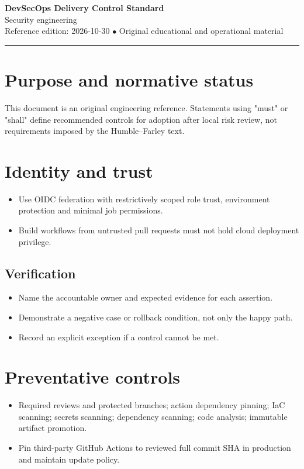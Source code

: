 \documentclass[10pt,letterpaper]{article}
\begin{document}
\begin{center}
{\LARGE\bfseries\color{cdblue}DevSecOps Delivery Control Standard}\\[7pt]
{\large Security engineering}\\[6pt]
{\small Reference edition: 2026-10-30 $\bullet$ Original educational and operational material}
\end{center}
\noindent\color{cdblue}\rule{\linewidth}{1.2pt}\color{black}
\vspace{0.4em}
\section{Purpose and normative status}
This document is an original engineering reference. Statements using "must" or "shall" define recommended controls for adoption after local risk review, not requirements imposed by the Humble--Farley text.


\section{Identity and trust}
\begin{itemize}
\item Use OIDC federation with restrictively scoped role trust, environment protection and minimal job permissions.
\item Build workflows from untrusted pull requests must not hold cloud deployment privilege.
\end{itemize}
\subsection{Verification}
\begin{itemize}
\item Name the accountable owner and expected evidence for each assertion.
\item Demonstrate a negative case or rollback condition, not only the happy path.
\item Record an explicit exception if a control cannot be met.
\end{itemize}


\section{Preventative controls}
\begin{itemize}
\item Required reviews and protected branches; action dependency pinning; IaC scanning; secrets scanning; dependency scanning; code analysis; immutable artifact promotion.
\item Pin third-party GitHub Actions to reviewed full commit SHA in production and maintain update policy.
\end{itemize}
\end{document}
